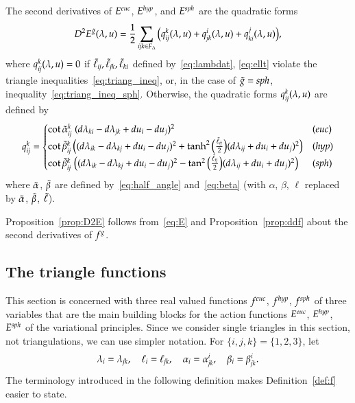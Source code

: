\documentclass[Thesis]{subfiles}
\begin{document}
\begin{proposition}
  \label{prop:D2E}
  The second derivatives of $E^{\euc}$, $E^{\mathit{hyp}}$, and $E^{\mathit{sph}}$ are the
  quadratic forms
  \begin{equation*}
    D^{2}E^{\tilde{g}}(\lambda,u)=\frac{1}{2}\sum_{{\it ijk}\in F_{\Delta}}
    \big(
    q_{\it ij}^{k}(\lambda,u) + q_{\it jk}^{i}(\lambda,u) + q_{\it
      ki}^{j}(\lambda,u)
    \big),
  \end{equation*}
  where $q_{\it ij}^{k}(\lambda,u)=0$ if\/ $\tilde{\ell}_{\it ij}, \tilde{\ell}_{\it
    jk}, \tilde{\ell}_{\it ki}$ defined by~\eqref{eq:lambdat},
  \eqref{eq:ellt} violate the triangle
  inequalities~\eqref{eq:triang_ineq}, or, in the case of $\tilde{g}=\mathit{sph}$,
  inequality~\eqref{eq:triang_ineq_sph}. Otherwise, the quadratic forms
  $q_{\it ij}^{k}(\lambda,u)$ are defined by
  \begin{equation*}
    q_{\it ij}^{k} = 
    \begin{cases}
      \cot\alphat_{\it ij}^k\;(d\lambda_{\it ki}-d\lambda_{\it jk}
      + du_i - du_j)^2
      &
      (\euc)
      \\
      \cot\betat^k_{\it ij}\,
      \big(
      (d\lambda_{\it ik}-d\lambda_{\it kj} +  du_i-du_j)^2
      +\tanh^2
      \big(
      \tfrac{\tilde \ell_{\it ij}}{2}
      \big)
      (d\lambda_{\it ij} +du_i+du_j)^2
      \big)
      &
      (\hyp)
      \\
      \cot\betat^k_{\it ij}\;
      \big(
      (d\lambda_{\it ik}-d\lambda_{\it kj} + du_i-du_j)^2
      -\tan^2
      \big(
      \tfrac{\tilde \ell_{\it ij}}{2}
      \big)
      (d\lambda_{\it ij} +du_i+du_j)^2
      \big)
      &
      (\sph)
    \end{cases}
  \end{equation*}
  where $\tilde{\alpha}$, $\tilde{\beta}$ are defined by~\eqref{eq:half_angle}
  and~\eqref{eq:beta} (with $\alpha$, $\beta$, $\ell$ replaced by
  $\tilde{\alpha}$, $\tilde{\beta}$, $\tilde{\ell}$). 
\end{proposition}

Proposition~\ref{prop:D2E} follows from~\eqref{eq:E} and
Proposition~\ref{prop:ddf} about the second derivatives of $f^{g}$.

\subsection{The triangle functions}
\label{sec:f}

This section is concerned with three real valued functions $f^{\euc}$,
$f^{\mathit{hyp}}$, $f^{\mathit{sph}}$ of three variables that are the main building
blocks for the action functions $E^{\euc}$, $E^{\mathit{hyp}}$, $E^{\mathit{sph}}$ of
the variational principles. 
Since we consider single triangles in this section, not
triangulations, we can use simpler notation. For
$\{i,j,k\}=\{1,2,3\}$, let
\begin{equation*}
  \lambda_{i}=\lambda_{\it jk},\quad 
  \ell_{i}=\ell_{\it jk},\quad
  \alpha_{i}=\alpha_{\it jk}^{i},\quad 
  \beta_{i}=\beta_{\it jk}^{i}.
\end{equation*}
The terminology introduced in the following definition makes
Definition~\ref{def:f} easier to state.
\end{document}

